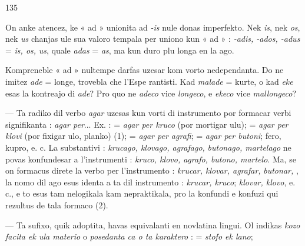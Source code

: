 \begin{VUpage}[139]{135}

On anke atencez, ke « ad » unionita ad \textit{-is} nule donas\nl
imperfekto. Nek \textit{is}, nek \textit{os}, nek \textit{us} chanjas ule sua valoro\nl
tempala per uniono kun « ad » : \textit{-adis, -ados, -adus} = \textit{is, os,}\nl
\textit{us}, quale \textit{adas} = \textit{as}, ma kun duro plu longa en la ago.

Kompreneble « ad » nultempe darfas uzesar kom vorto\nl
nedependanta. Do ne imitez \textit{ade} = longe, trovebla che l'Espe\cc
rantisti. Kad \textit{malade} = kurte, o kad \textit{eke} esas la kontreajo di\nl
\textit{ade}? Pro quo ne \textit{adeco} vice \textit{longeco}, e \textit{ekeco} vice \textit{mallongeco}?\parplein

 --- Ta radiko dil verbo \textit{agar} uzesas kun vorti di\nl
instrumento por formacar verbi signifikanta : \textit{agar per}...\nl
Ex. :  = \textit{agar per kruco} (por mortigar ulu); \nl
= \textit{agar per klovi} (por fixigar ulo, planko) (1);  =\nl
\textit{agar per agrafi};  = \textit{agar per butoni}; \nl
fero, kupro, e. c. La substantivi : \textit{krucago, klovago, agrafago,}\nl
\textit{butonago, martelago} ne povas konfundesar a l'instrumenti :\nl
\textit{kruco, klovo, agrafo, butono, martelo}. Ma, se on formacus\nl
direte la verbo per l'instrumento : \textit{krucar, klovar, agrafar,}\nl
\textit{butonar, }, la nomo dil ago esus identa a ta dil\nl
instrumento : \textit{krucar, kruco}; \textit{klovar, klovo}, e. c., e to esus\nl
tam nelogikala kam nepraktikala, pro la konfundi e konfuzi\nl
qui rezultus de tala formaco (2).

 --- Ta sufixo, quik adoptita, havas equivalanti en\nl
novlatina lingui. Ol indikas \textit{kozo facita ek ula materio} o\nl
\textit{posedanta ca o ta karaktero} :  = \textit{stofo ek lano}; \parplein
\end{VUpage}

